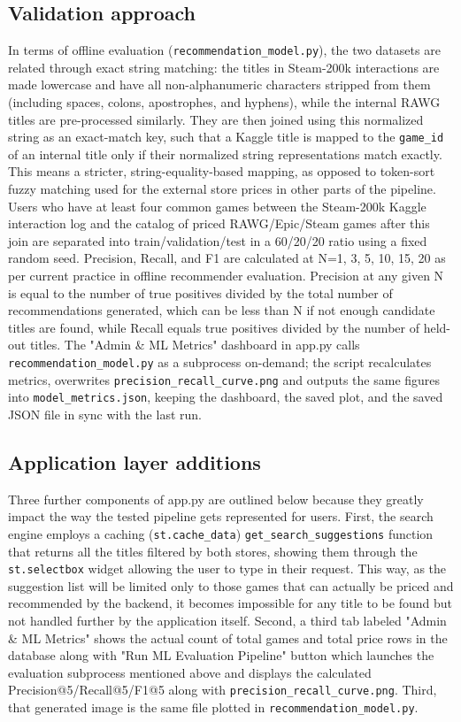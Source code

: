 \documentclass[fleqn,10pt]{wlscirep}
\begin{document}
\subsection*{Validation approach}

In terms of offline evaluation (\texttt{recommendation\_model.py}), the two datasets are related through exact string matching: the titles in Steam-200k interactions are made lowercase and have all non-alphanumeric characters stripped from them (including spaces, colons, apostrophes, and hyphens), while the internal RAWG titles are pre-processed similarly. They are then joined using this normalized string as an exact-match key, such that a Kaggle title is mapped to the \texttt{game\_id} of an internal title only if their normalized string representations match exactly. This means a stricter, string-equality-based mapping, as opposed to token-sort fuzzy matching used for the external store prices in other parts of the pipeline. Users who have at least four common games between the Steam-200k Kaggle interaction log\cite{Kaggle:steam200k} and the catalog of priced RAWG/Epic/Steam games after this join are separated into train/validation/test in a 60/20/20 ratio using a fixed random seed. Precision, Recall, and F1 are calculated at N={1, 3, 5, 10, 15, 20} as per current practice in offline recommender evaluation\cite{Bauer:evalrecsys:2024}. Precision at any given N is equal to the number of true positives divided by the total number of recommendations generated, which can be less than N if not enough candidate titles are found, while Recall equals true positives divided by the number of held-out titles. The "Admin \& ML Metrics" dashboard in app.py calls \texttt{recommendation\_model.py} as a subprocess on-demand; the script recalculates metrics, overwrites \texttt{precision\_recall\_curve.png} and outputs the same figures into \texttt{model\_metrics.json}, keeping the dashboard, the saved plot, and the saved JSON file in sync with the last run.

\subsection*{Application layer additions}

Three further components of app.py are outlined below because they greatly impact the way the tested pipeline gets represented for users. First, the search engine employs a caching (\texttt{st.cache\_data}) \texttt{get\_search\_suggestions} function that returns all the titles filtered by both stores, showing them through the \texttt{st.selectbox} widget allowing the user to type in their request. This way, as the suggestion list will be limited only to those games that can actually be priced and recommended by the backend, it becomes impossible for any title to be found but not handled further by the application itself. Second, a third tab labeled "Admin \& ML Metrics" shows the actual count of total games and total price rows in the database along with "Run ML Evaluation Pipeline" button which launches the evaluation subprocess mentioned above and displays the calculated Precision@5/Recall@5/F1@5 along with \texttt{precision\_recall\_curve.png}. Third, that generated image is the same file plotted in \texttt{recommendation\_model.py}.
\end{document}
